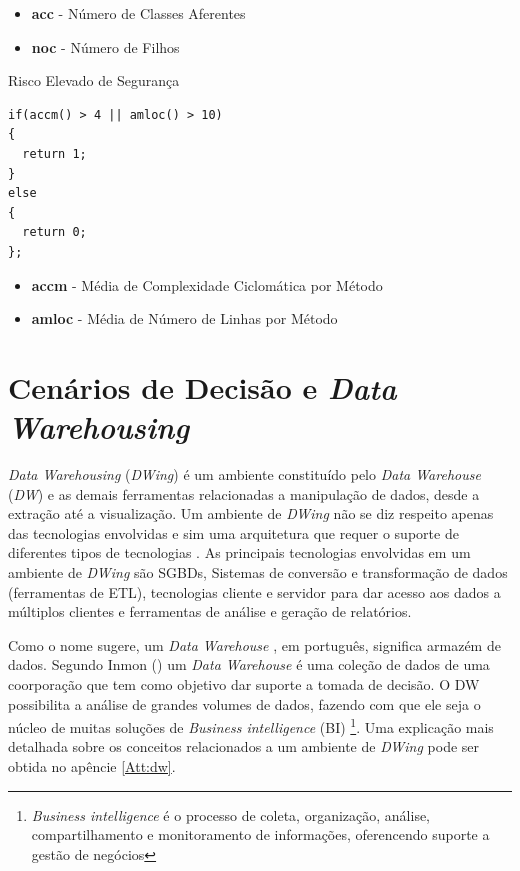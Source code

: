 \begin{itemize}
	\item \textbf{acc} - Número de Classes Aferentes
	\item \textbf{noc} - Número de Filhos
\end{itemize}

\begin{description}
	\item[Risco Elevado de Segurança]
\end{description}

\begin{lstlisting}[caption={\emph{Script} do Cenário \emph{High Risk Security}}, label=cpf]
if(accm() > 4 || amloc() > 10)
{
  return 1;
}
else
{
  return 0;
};
\end{lstlisting}

\begin{itemize}
	\item \textbf{accm} - Média de Complexidade Ciclomática por Método
	\item \textbf{amloc} - Média de Número de Linhas por Método
\end{itemize}

\section{Cenários de Decisão e \emph{Data Warehousing}}
\label{dw-cenarios}

\emph{Data Warehousing} (\emph{DWing}) é um ambiente constituído pelo \emph{Data Warehouse} (\emph{DW}) e as demais ferramentas relacionadas a manipulação de dados, desde a extração até a visualização. Um ambiente de \emph{DWing} não se diz respeito apenas das tecnologias envolvidas e sim uma arquitetura que requer o suporte de diferentes tipos de tecnologias \cite{inmon2002}.  As principais tecnologias envolvidas em um ambiente de \emph{DWing} são SGBDs, Sistemas de conversão e transformação de dados (ferramentas de ETL), tecnologias cliente e servidor para dar acesso aos dados a múltiplos clientes e ferramentas de análise e geração de relatórios.

Como o nome sugere, um \emph{Data Warehouse} , em português, significa armazém de dados. Segundo Inmon (\citeyear{inmon2002}) um \emph{Data Warehouse} é uma coleção de dados de uma coorporação que tem como objetivo dar suporte a tomada de decisão. 
%
O DW possibilita a análise de grandes volumes de dados, fazendo com que ele seja o núcleo de muitas soluções de \emph{Business intelligence} (BI)
%
\footnote{\emph{Business intelligence} é o processo de coleta, organização, análise, compartilhamento e monitoramento de informações, oferencendo suporte a gestão de negócios}. 
%
Uma explicação mais detalhada sobre os  conceitos relacionados a um ambiente de \emph{DWing} pode ser obtida no  apêncie \ref{Att:dw}.

